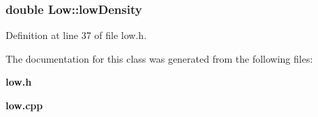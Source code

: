 \subsubsection{\setlength{\rightskip}{0pt plus 5cm}double {\bf Low::low\-Density}\hspace{0.3cm}{\tt  [protected]}}\label{classLow_p0}




Definition at line 37 of file low.h.

The documentation for this class was generated from the following files:\begin{CompactItemize}
\item 
{\bf low.h}\item 
{\bf low.cpp}\end{CompactItemize}
